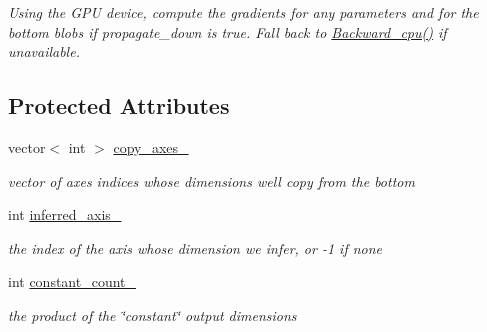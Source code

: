 \begin{DoxyCompactItemize}
\begin{DoxyCompactList}\small\item\em Using the G\+PU device, compute the gradients for any parameters and for the bottom blobs if propagate\+\_\+down is true. Fall back to \hyperlink{classcaffe_1_1ReshapeLayer_af2af482e9fa1c06c03359c8cfc78a7a2}{Backward\+\_\+cpu()} if unavailable. \end{DoxyCompactList}\end{DoxyCompactItemize}
\subsection*{Protected Attributes}
\begin{DoxyCompactItemize}
\item 
vector$<$ int $>$ \hyperlink{classcaffe_1_1ReshapeLayer_ace08e8747c8d4562fbc26ca789681a4a}{copy\+\_\+axes\+\_\+}\hypertarget{classcaffe_1_1ReshapeLayer_ace08e8747c8d4562fbc26ca789681a4a}{}\label{classcaffe_1_1ReshapeLayer_ace08e8747c8d4562fbc26ca789681a4a}

\begin{DoxyCompactList}\small\item\em vector of axes indices whose dimensions we\textquotesingle{}ll copy from the bottom \end{DoxyCompactList}\item 
int \hyperlink{classcaffe_1_1ReshapeLayer_a41111d585f1a9a64fd774ca1bf7d4160}{inferred\+\_\+axis\+\_\+}\hypertarget{classcaffe_1_1ReshapeLayer_a41111d585f1a9a64fd774ca1bf7d4160}{}\label{classcaffe_1_1ReshapeLayer_a41111d585f1a9a64fd774ca1bf7d4160}

\begin{DoxyCompactList}\small\item\em the index of the axis whose dimension we infer, or -\/1 if none \end{DoxyCompactList}\item 
int \hyperlink{classcaffe_1_1ReshapeLayer_abbb071bc8398e2b0442302e51c644c28}{constant\+\_\+count\+\_\+}\hypertarget{classcaffe_1_1ReshapeLayer_abbb071bc8398e2b0442302e51c644c28}{}\label{classcaffe_1_1ReshapeLayer_abbb071bc8398e2b0442302e51c644c28}

\begin{DoxyCompactList}\small\item\em the product of the \char`\"{}constant\char`\"{} output dimensions \end{DoxyCompactList}\end{DoxyCompactItemize}


